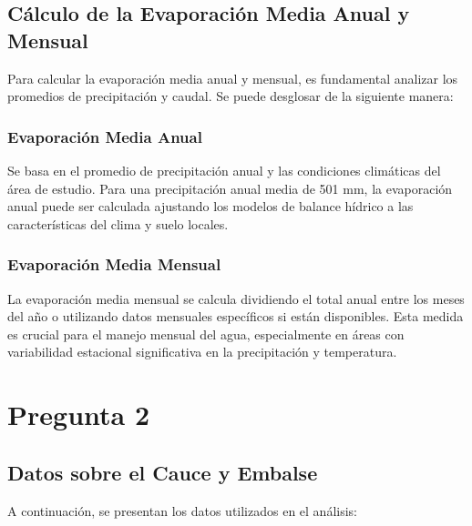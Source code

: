 \documentclass{article} %
\begin{document}
\subsection{Cálculo de la Evaporación Media Anual y Mensual}

Para calcular la evaporación media anual y mensual, es fundamental analizar los promedios de precipitación y caudal. Se puede desglosar de la siguiente manera:

\subsubsection{Evaporación Media Anual}

Se basa en el promedio de precipitación anual y las condiciones climáticas del área de estudio. Para una precipitación anual media de 501 mm, la evaporación anual puede ser calculada ajustando los modelos de balance hídrico a las características del clima y suelo locales.

\subsubsection{Evaporación Media Mensual}

La evaporación media mensual se calcula dividiendo el total anual entre los meses del año o utilizando datos mensuales específicos si están disponibles. Esta medida es crucial para el manejo mensual del agua, especialmente en áreas con variabilidad estacional significativa en la precipitación y temperatura.


\newpage
\section{Pregunta 2}

\subsection{Datos sobre el Cauce y Embalse}

A continuación, se presentan los datos utilizados en el análisis:
\end{document}
